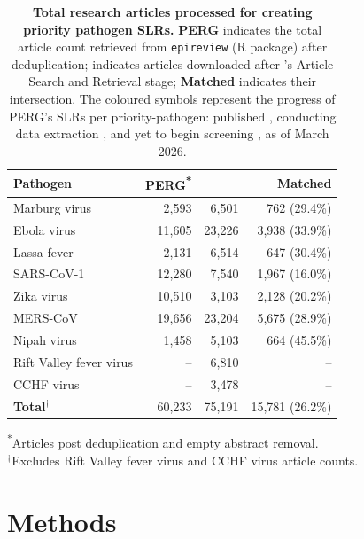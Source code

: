 

\begin{table}[t!]
\centering
\footnotesize
\caption{\textbf{Total research articles processed for creating priority pathogen SLRs.} \textbf{PERG} indicates the total article count retrieved from \texttt{epireview} (R package) after deduplication; \textbf{\name{}} indicates articles downloaded after \name{}'s Article Search and Retrieval stage; \textbf{Matched} indicates their intersection. The coloured symbols represent the progress of PERG's SLRs per priority-pathogen: published \published{}, conducting data extraction \extractionphase{}, and yet to begin screening \notstarted{}, as of March 2026.}
\setlength{\tabcolsep}{3pt}
\renewcommand{\arraystretch}{1.1}
\label{tab:article_count_summary_ours_pergs}
\begin{tabular}{lrrr}
\toprule
\textbf{Pathogen} & \textbf{PERG\textsuperscript{*}} & \textbf{\name{}} & \textbf{Matched} \\
\midrule
\published{} Marburg virus & 2,593 & 6,501 & 762 (29.4\%) \\
\published{} Ebola virus & 11,605 & 23,226 & 3,938 (33.9\%) \\
\published{} Lassa fever & 2,131 & 6,514 & 647 (30.4\%) \\
\published{} SARS-CoV-1 & 12,280 & 7,540 & 1,967 (16.0\%) \\
\published{} Zika virus & 10,510 & 3,103 & 2,128 (20.2\%) \\
\extractionphase{} MERS-CoV & 19,656 & 23,204 & 5,675 (28.9\%) \\
\extractionphase{} Nipah virus & 1,458 & 5,103 & 664 (45.5\%) \\
\notstarted{} Rift Valley fever virus & -- & 6,810 & -- \\
\notstarted{}  CCHF virus & -- & 3,478 & -- \\
\midrule
\textbf{Total}$^{\dagger}$ & 60,233 & 75,191 & 15,781 (26.2\%) \\
\bottomrule
\end{tabular}
\par{\scriptsize
\textsuperscript{*}Articles post deduplication and empty abstract removal. \\
$^{\dagger}$Excludes Rift Valley fever virus and CCHF virus article counts.}
\end{table}



\section{Methods}

